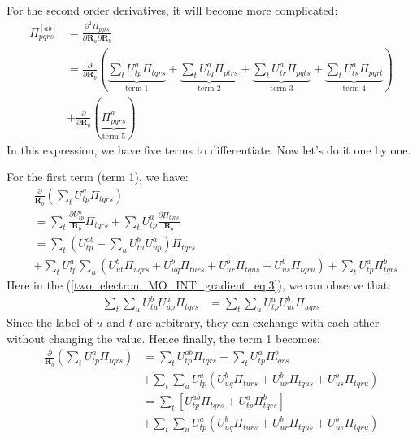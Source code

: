For the second order derivatives, it will become more complicated:
\begin{align}
 \label{two_electron_MO_INT_gradient_eq:2}
\Pi_{pqrs}^{[ab]} &=\frac{\partial^{2} \Pi_{pqrs}}{\partial \bm{R}_{a}\partial
\bm{R}_{b}} \nonumber \\
&= \frac{\partial}{\partial\bm{R}_{b}}\left(
\underbrace{\sum_{t}U^{a}_{tp}\Pi_{tqrs}}_{\text{term 1}} +
\underbrace{\sum_{t}U^{a}_{tq}\Pi_{ptrs}}_{\text{term 2}} + 
\underbrace{\sum_{t}U^{a}_{tr}\Pi_{pqts}}_{\text{term 3}} + 
\underbrace{\sum_{t}U^{a}_{ts}\Pi_{pqrt}}_{\text{term 4}} \right)  \nonumber \\
 &+
\frac{\partial}{\partial\bm{R}_{b}}\left(
\underbrace{\Pi^{a}_{pqrs}}_{\text{term
5}}\right) 
\end{align}
In this expression, we have five terms to differentiate. Now let's do it one by
one.

For the first term (term 1), we have:
\begin{align}
  \label{two_electron_MO_INT_gradient_eq:3}
&\frac{\partial}{\bm{R}_{b}}\left( \sum_{t}U^{a}_{tp}\Pi_{tqrs}\right)
\nonumber \\
&=\sum_{t}\frac{\partial U^{a}_{tp}}{\bm{R}_{b}}\Pi_{tqrs} +
\sum_{t}U^{a}_{tp}\frac{\partial \Pi_{tqrs}}{\bm{R}_{b}} \nonumber \\
&= \sum_{t}\left( U^{ab}_{tp} - \sum_{u}U^{b}_{tu}U^{a}_{up}\right) \Pi_{tqrs}
\nonumber \\
&+ \sum_{t}U^{a}_{tp}\sum_{u}\left( 
U^{b}_{ut}\Pi_{uqrs} +
U^{b}_{uq}\Pi_{turs} + 
U^{b}_{ur}\Pi_{tqus} + 
U^{b}_{us}\Pi_{tqru}  
\right) + \sum_{t}U^{a}_{tp}\Pi^{b}_{tqrs}
\end{align}
Here in the (\ref{two_electron_MO_INT_gradient_eq:3}), we can observe that:
\begin{align}
   \label{two_electron_MO_INT_gradient_eq:4}
\sum_{t}\sum_{u}U^{b}_{tu}U^{a}_{up}\Pi_{tqrs} &=
\sum_{t}\sum_{u}U^{a}_{tp}U^{b}_{ut}\Pi_{uqrs}
\end{align}
Since the label of $u$ and $t$ are arbitrary, they can exchange with each other
without changing the value. Hence finally, the term 1 becomes:
\begin{align}
 \label{two_electron_MO_INT_gradient_eq:5}
 \frac{\partial}{\bm{R}_{b}}\left( \sum_{t}U^{a}_{tp}\Pi_{tqrs}\right)
&= \sum_{t} U^{ab}_{tp}\Pi_{tqrs} +
\sum_{t}U^{a}_{tp}\Pi^{b}_{tqrs} \nonumber \\
&+ \sum_{t}\sum_{u}U^{a}_{tp}\left(
U^{b}_{uq}\Pi_{turs} + 
U^{b}_{ur}\Pi_{tqus} + 
U^{b}_{us}\Pi_{tqru}  
\right) \nonumber \\
&=   \sum_{t} \left[ U^{ab}_{tp}\Pi_{tqrs} + U^{a}_{tp}\Pi^{b}_{tqrs}\right] 
\nonumber \\
&+ \sum_{t}\sum_{u}U^{a}_{tp}\left(
U^{b}_{uq}\Pi_{turs} + 
U^{b}_{ur}\Pi_{tqus} + 
U^{b}_{us}\Pi_{tqru}  
\right)
\end{align}

